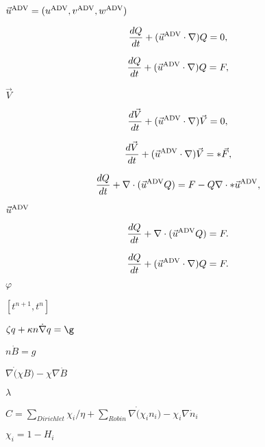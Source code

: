 \documentclass{article}
\begin{document}
$ \vec{u}^{\mbox{\scriptsize ADV}} = (u^{\mbox{\scriptsize
  ADV}},v^{\mbox{\scriptsize ADV}},w^{\mbox{\scriptsize ADV}}) $
\pagebreak

\[

     \frac{dQ}{dt} + (\vec{u}^{\mbox{\scriptsize ADV}} \cdot \nabla)Q = 0,

\]
\pagebreak

\[

     \frac{dQ}{dt} + (\vec{u}^{\mbox{\scriptsize ADV}} \cdot \nabla)Q = F,

\]
\pagebreak

$ \vec{V} $
\pagebreak

\[

     \frac{d\vec{V}}{dt} + (\vec{u}^{\mbox{\scriptsize ADV}} \cdot \nabla)\vec{V} = 0,

\]
\pagebreak

\[
 
       \frac{d\vec{V}}{dt} + (\vec{u}^{\mbox{\scriptsize ADV}} \cdot \nabla)\vec{V} =
*\vec{F},
 
  \]
\pagebreak

\[
 
       \frac{dQ}{dt} + \nabla \cdot (\vec{u}^{\mbox{\scriptsize ADV}} Q) = F - Q \nabla \cdot
*\vec{u}^{\mbox{\scriptsize ADV}},
 
  \]
\pagebreak

$
  \vec{u}^{\mbox{\scriptsize ADV}} $
\pagebreak

\[
 
       \frac{dQ}{dt} + \nabla \cdot (\vec{u}^{\mbox{\scriptsize ADV}} Q) = F.
 
  \]
\pagebreak

\[
 
       \frac{dQ}{dt} + (\vec{u}^{\mbox{\scriptsize ADV}} \cdot \nabla) Q = F.
 
  \]
\pagebreak

$ \varphi $
\pagebreak

$ [t^{n+1}, t^n] $
\pagebreak

$ \zeta q + \kappa n \dot \nabla q = \g $
\pagebreak

$ n \dot B = g $
\pagebreak

$ \nabla \dot (\chi B) - \chi \nabla \dot B $
\pagebreak

$\lambda$
\pagebreak

$ C = \sum_{Dirichlet} \chi_i/\eta  + \sum_{Robin} \nabla \dot (\chi_i n_i) - \chi_i \nabla \dot n_i$
\pagebreak

$\chi_i = 1-H_i$
\pagebreak
\end{document}
